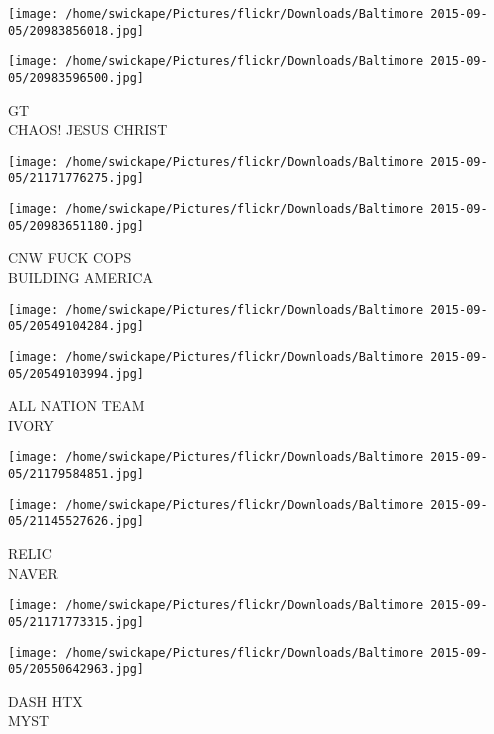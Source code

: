 \documentclass[10pt,letterpaper]{article}
\begin{document}
\texttt{[image: /home/swickape/Pictures/flickr/Downloads/Baltimore 2015-09-05/20983856018.jpg]}

\vspace{0.25in}
\texttt{[image: /home/swickape/Pictures/flickr/Downloads/Baltimore 2015-09-05/20983596500.jpg]}

GT\\
CHAOS!  JESUS CHRIST\\
\pagebreak

\texttt{[image: /home/swickape/Pictures/flickr/Downloads/Baltimore 2015-09-05/21171776275.jpg]}

\vspace{0.25in}
\texttt{[image: /home/swickape/Pictures/flickr/Downloads/Baltimore 2015-09-05/20983651180.jpg]}

CNW FUCK COPS\\
BUILDING AMERICA\\
\pagebreak

\texttt{[image: /home/swickape/Pictures/flickr/Downloads/Baltimore 2015-09-05/20549104284.jpg]}

\vspace{0.25in}
\texttt{[image: /home/swickape/Pictures/flickr/Downloads/Baltimore 2015-09-05/20549103994.jpg]}

ALL NATION TEAM\\
IVORY\\
\pagebreak

\texttt{[image: /home/swickape/Pictures/flickr/Downloads/Baltimore 2015-09-05/21179584851.jpg]}

\vspace{0.25in}
\texttt{[image: /home/swickape/Pictures/flickr/Downloads/Baltimore 2015-09-05/21145527626.jpg]}

RELIC\\
NAVER\\
\pagebreak

\texttt{[image: /home/swickape/Pictures/flickr/Downloads/Baltimore 2015-09-05/21171773315.jpg]}

\vspace{0.25in}
\texttt{[image: /home/swickape/Pictures/flickr/Downloads/Baltimore 2015-09-05/20550642963.jpg]}

DASH HTX\\
MYST\\
\pagebreak
\end{document}

